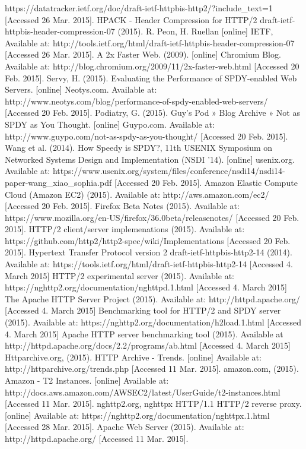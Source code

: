 \documentclass{article}
\begin{document}
\begin{thebibliography}
https://datatracker.ietf.org/doc/draft-ietf-httpbis-http2/?include\_text=1 [Accessed 26 Mar. 2015].
HPACK - Header Compression for HTTP/2 draft-ietf-httpbis-header-compression-07 (2015). R. Peon,  H. Ruellan [online] IETF, Available at: http://tools.ietf.org/html/draft-ietf-httpbis-header-compression-07 [Accessed 26 Mar. 2015].
A 2x Faster Web. (2009). [online] Chromium Blog. Available at: http://blog.chromium.org/2009/11/2x-faster-web.html [Accessed 20 Feb. 2015].
Servy, H. (2015). Evaluating the Performance of SPDY-enabled Web Servers. [online] Neotys.com. Available at: http://www.neotys.com/blog/performance-of-spdy-enabled-web-servers/ [Accessed 20 Feb. 2015].
Podiatry, G. (2015). Guy's Pod » Blog Archive » Not as SPDY as You Thought. [online] Guypo.com. Available at: http://www.guypo.com/not-as-spdy-as-you-thought/ [Accessed 20 Feb. 2015].
Wang et al. (2014). How Speedy is SPDY?, 11th USENIX Symposium on Networked Systems Design and Implementation (NSDI ’14). [online] usenix.org. Available at:
https://www.usenix.org/system/files/conference/nsdi14/nsdi14-paper-wang\_xiao\_sophia.pdf [Accessed 20 Feb. 2015].
 Amazon Elastic Compute Cloud (Amazon EC2) (2015). Available at: http://aws.amazon.com/ec2/ [Accessed 20 Feb. 2015].
 Firefox Beta Notes (2015). Available at: https://www.mozilla.org/en-US/firefox/36.0beta/releasenotes/ [Accessed 20 Feb. 2015].
  HTTP/2 client/server implemenations (2015). Available at: https://github.com/http2/http2-spec/wiki/Implementations [Accessed 20 Feb. 2015].
 Hypertext Transfer Protocol version 2 draft-ietf-httpbis-http2-14 (2014). Available at: https://tools.ietf.org/html/draft-ietf-httpbis-http2-14 [Accessed 4. March 2015]
 HTTP/2 experimental server (2015). Available at: https://nghttp2.org/documentation/nghttpd.1.html [Accessed 4. March 2015]
 The Apache HTTP Server Project (2015). Available at: http://httpd.apache.org/ [Accessed 4. March 2015]
 Benchmarking tool for HTTP/2 and SPDY server (2015). Available at: https://nghttp2.org/documentation/h2load.1.html [Accessed 4. March 2015]
 Apache HTTP server benchmarking tool (2015). Available at http://httpd.apache.org/docs/2.2/programs/ab.html [Accessed 4. March 2015]
 Httparchive.org, (2015). HTTP Archive - Trends. [online] Available at: http://httparchive.org/trends.php [Accessed 11 Mar. 2015].
 amazon.com, (2015). Amazon - T2 Instances. [online] Available at: http://docs.aws.amazon.com/AWSEC2/latest/UserGuide/t2-instances.html [Accessed 11 Mar. 2015].
 nghttp2.org, nghttpx HTTP/1.1 HTTP/2 reverse proxy. [online] Available at: https://nghttp2.org/documentation/nghttpx.1.html [Accessed 28 Mar. 2015].
 Apache Web Server (2015). Available at: http://httpd.apache.org/  [Accessed 11 Mar. 2015].
\end{thebibliography}
\end{document}

